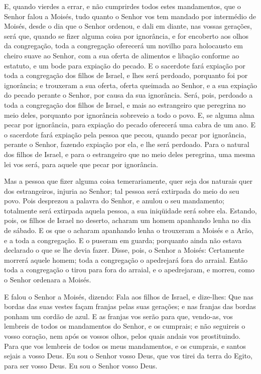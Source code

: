 E, quando vierdes a errar, e não cumprirdes todos estes
mandamentos, que o Senhor falou a Moisés, tudo quanto o
Senhor vos tem mandado por intermédio de Moisés, desde o dia que o
Senhor ordenou, e dali em diante, nas vossas gerações, será
que, quando se fizer alguma coisa por ignorância, e for encoberto
aos olhos da congregação, toda a congregação oferecerá um novilho
para holocausto em cheiro suave ao Senhor, com a sua oferta de
alimentos e libação conforme ao estatuto, e um bode para expiação do
pecado. E o sacerdote fará expiação por toda a congregação
dos filhos de Israel, e lhes será perdoado, porquanto foi por
ignorância; e trouxeram a sua oferta, oferta queimada ao Senhor, e a
sua expiação do pecado perante o Senhor, por causa da sua
ignorância. Será, pois, perdoado a toda a congregação dos
filhos de Israel, e mais ao estrangeiro que peregrina no meio deles,
porquanto por ignorância sobreveio a todo o povo. E, se
alguma alma pecar por ignorância, para expiação do pecado oferecerá
uma cabra de um ano. E o sacerdote fará expiação pela pessoa
que pecou, quando pecar por ignorância, perante o Senhor, fazendo
expiação por ela, e lhe será perdoado. Para o natural dos
filhos de Israel, e para o estrangeiro que no meio deles peregrina,
uma mesma lei vos será, para aquele que pecar por ignorância.

Mas a pessoa que fizer alguma coisa temerariamente, quer seja dos
naturais quer dos estrangeiros, injuria ao Senhor; tal pessoa será
extirpada do meio do seu povo. Pois desprezou a palavra do
Senhor, e anulou o seu mandamento; totalmente será extirpada aquela
pessoa, a sua iniqüidade será sobre ela. Estando, pois, os
filhos de Israel no deserto, acharam um homem apanhando lenha no dia
de sábado. E os que o acharam apanhando lenha o trouxeram a
Moisés e a Arão, e a toda a congregação. E o puseram em
guarda; porquanto ainda não estava declarado o que se lhe devia
fazer. Disse, pois, o Senhor a Moisés: Certamente morrerá
aquele homem; toda a congregação o apedrejará fora do arraial.
Então toda a congregação o tirou para fora do arraial, e o
apedrejaram, e morreu, como o Senhor ordenara a Moisés.

E falou o Senhor a Moisés, dizendo: Fala aos filhos de
Israel, e dize-lhes: Que nas bordas das suas vestes façam franjas
pelas suas gerações; e nas franjas das bordas ponham um cordão de
azul. E as franjas vos serão para que, vendo-as, vos lembreis
de todos os mandamentos do Senhor, e os cumprais; e não seguireis o
vosso coração, nem após os vossos olhos, pelos quais andais vos
prostituindo. Para que vos lembreis de todos os meus
mandamentos, e os cumprais, e santos sejais a vosso Deus. Eu
sou o Senhor vosso Deus, que vos tirei da terra do Egito, para ser
vosso Deus. Eu sou o Senhor vosso Deus.

